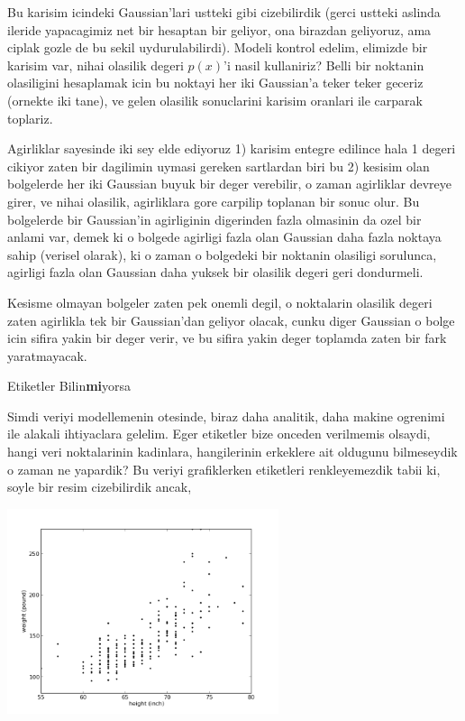 \documentclass[12pt,fleqn]{article}\usepackage{../common}
\begin{document}
Bu karisim icindeki Gaussian'lari ustteki gibi cizebilirdik (gerci ustteki
aslinda ileride yapacagimiz net bir hesaptan bir geliyor, ona birazdan
geliyoruz, ama ciplak gozle de bu sekil uydurulabilirdi). Modeli kontrol
edelim, elimizde bir karisim var, nihai olasilik degeri $p(x)$'i nasil
kullaniriz? Belli bir noktanin olasiligini hesaplamak icin bu noktayi her
iki Gaussian'a teker teker geceriz (ornekte iki tane), ve gelen olasilik
sonuclarini karisim oranlari ile carparak toplariz.

Agirliklar sayesinde iki sey elde ediyoruz 1) karisim entegre edilince hala
1 degeri cikiyor zaten bir dagilimin uymasi gereken sartlardan biri bu 2)
kesisim olan bolgelerde her iki Gaussian buyuk bir deger verebilir, o zaman
agirliklar devreye girer, ve nihai olasilik, agirliklara gore carpilip
toplanan bir sonuc olur. Bu bolgelerde bir Gaussian'in agirliginin
digerinden fazla olmasinin da ozel bir anlami var, demek ki o bolgede
agirligi fazla olan Gaussian daha fazla noktaya sahip (verisel olarak), ki
o zaman o bolgedeki bir noktanin olasiligi sorulunca, agirligi fazla olan
Gaussian daha yuksek bir olasilik degeri geri dondurmeli.

Kesisme olmayan bolgeler zaten pek onemli degil, o noktalarin olasilik
degeri zaten agirlikla tek bir Gaussian'dan geliyor olacak, cunku diger
Gaussian o bolge icin sifira yakin bir deger verir, ve bu sifira yakin
deger toplamda zaten bir fark yaratmayacak.

Etiketler Bilin\textbf{mi}yorsa

Simdi veriyi modellemenin otesinde, biraz daha analitik, daha makine
ogrenimi ile alakali ihtiyaclara gelelim. Eger etiketler bize onceden
verilmemis olsaydi, hangi veri noktalarinin kadinlara, hangilerinin
erkeklere ait oldugunu bilmeseydik o zaman ne yapardik? Bu veriyi
grafiklerken etiketleri renkleyemezdik tabii ki, soyle bir resim
cizebilirdik ancak,

\includegraphics[height=6cm]{plotbio2.png}
\end{document}
